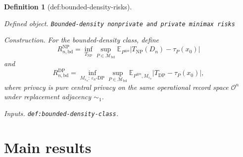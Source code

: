 \documentclass{article}
\newtheorem{definition}{Definition}
\begin{document}
\begin{definition}[def:bounded-density-risks]\label{def:bounded-density-risks}
\par\smallskip\noindent\emph{Defined object.} \texttt{Bounded-\allowbreak{}density nonprivate and private minimax risks}
\par\smallskip\noindent\emph{Construction.} For the bounded-density class, define
\[
 R_{n,\mathrm{bd}}^{\mathrm{NP}}
 =\inf_{T_{\mathrm{NP}}}\sup_{P\in\mathcal M_{\mathrm{bd}}}
   \mathbb E_{P^{\otimes n}}\left|T_{\mathrm{NP}}(D_n)-\tau_P(x_0)\right|
\]
and
\[
 R_{n,\mathrm{bd}}^{\mathrm{DP}}
 =\inf_{M_{\varepsilon_n}:\,\varepsilon_n\text{-DP}}
   \sup_{P\in\mathcal M_{\mathrm{bd}}}
   \mathbb E_{P^{\otimes n},M_{\varepsilon_n}}
   \left|T_{\mathrm{DP}}-\tau_P(x_0)\right|,
\]
where privacy is pure central privacy on the same operational record space \(\mathcal O^n\) under replacement adjacency \(\sim_1\).
\par\smallskip\noindent\emph{Inputs.} \texttt{def:\allowbreak{}bounded-\allowbreak{}density-\allowbreak{}class}.
\end{definition}

\section{Main results}
\end{document}
